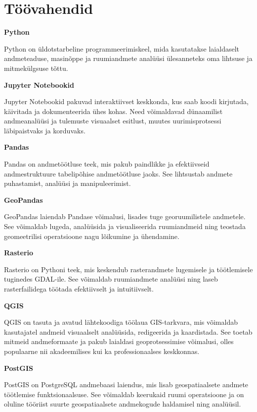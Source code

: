 \section{Töövahendid}


\textbf{Python}

Python on üldotstarbeline programmeerimiskeel, mida kasutatakse
laialdaselt andmeteaduse, masinõppe ja ruumiandmete analüüsi ülesanneteks
oma lihtsuse ja mitmekülgsuse tõttu.



\textbf{Jupyter Notebookid}\nopagebreak[4]

Jupyter Notebookid pakuvad interaktiivset keskkonda, kus
saab koodi kirjutada, käivitada ja dokumenteerida ühes kohas. Need võimaldavad
dünaamilist andmeanalüüsi ja tulemuste visuaalset esitlust, muutes
uurimisprotsessi läbipaistvaks ja korduvaks.



\textbf{Pandas}\nopagebreak[4]

Pandas on andmetöötluse teek, mis pakub paindlikke ja
efektiivseid andmestruktuure tabelipõhise andmetöötluse jaoks. See lihtsustab
andmete puhastamist, analüüsi ja manipuleerimist.


\textbf{GeoPandas}\nopagebreak[4]

GeoPandas laiendab Pandase võimalusi, lisades tuge georuumilistele
andmetele. See võimaldab lugeda, analüüsida ja visualiseerida
ruumiandmeid ning teostada geomeetrilisi operatsioone nagu lõikumine ja
ühendamine.


\textbf{Rasterio}\nopagebreak[4]

Rasterio on Pythoni teek, mis keskendub rasterandmete lugemisele
ja töötlemisele tuginedes GDAL-ile. See võimaldab ruumiandmete analüüsi
ning laseb rasterfailidega töötada efektiivselt ja intuitiivselt.

\textbf{QGIS}\nopagebreak[4]

QGIS on tasuta ja avatud lähtekoodiga töölaua GIS-tarkvara, mis võimaldab
kasutajatel andmeid visuaalselt analüüsida, redigeerida ja kaardistada. See
toetab mitmeid andmeformaate ja pakub laialdasi geoprotsessimise võimalusi,
olles populaarne nii akadeemilises kui ka professionaalses keskkonnas.


\textbf{PostGIS}\nopagebreak[4]

PostGIS on PostgreSQL andmebaasi laiendus, mis lisab geospatiaalsete
andmete töötlemise funktsionaalsuse. See võimaldab keerukaid ruumi operatsioone
ja on oluline tööriist suurte geospatiaalsete andmekogude haldamisel ning
analüüsil.

